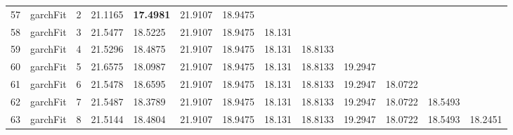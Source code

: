 \documentclass[10pt,a4paper]{article}
\begin{document}
\begin{table}[ht]
\begin{tabular}{rlrllllllllll}
  57 & garchFit &     2 & 21.1165 & \textbf{17.4981} & 21.9107 & 18.9475 &  &  &  &  &  &  \\ 
  58 & garchFit &     3 & 21.5477 & 18.5225 & 21.9107 & 18.9475 & 18.131 &  &  &  &  &  \\ 
  59 & garchFit &     4 & 21.5296 & 18.4875 & 21.9107 & 18.9475 & 18.131 & 18.8133 &  &  &  &  \\ 
  60 & garchFit &     5 & 21.6575 & 18.0987 & 21.9107 & 18.9475 & 18.131 & 18.8133 & 19.2947 &  &  &  \\ 
  61 & garchFit &     6 & 21.5478 & 18.6595 & 21.9107 & 18.9475 & 18.131 & 18.8133 & 19.2947 & 18.0722 &  &  \\ 
  62 & garchFit &     7 & 21.5487 & 18.3789 & 21.9107 & 18.9475 & 18.131 & 18.8133 & 19.2947 & 18.0722 & 18.5493 &  \\ 
  63 & garchFit &     8 & 21.5144 & 18.4804 & 21.9107 & 18.9475 & 18.131 & 18.8133 & 19.2947 & 18.0722 & 18.5493 & 18.2451 \\ 
   \hline
\end{tabular}
\end{table}
\end{document}
